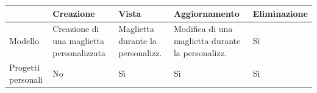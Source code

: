 \documentclass[12pt,italian,]{report}
\begin{document}
\begin{longtable}[]{lllll}
\toprule
\begin{minipage}[b]{0.17\columnwidth}\raggedright
\strut
\end{minipage} & \begin{minipage}[c]{0.17\columnwidth}\raggedright
Creazione\strut
\end{minipage} & \begin{minipage}[c]{0.17\columnwidth}\raggedright
Vista\strut
\end{minipage} & \begin{minipage}[c]{0.27\columnwidth}\raggedright
Aggiornamento\strut
\end{minipage} & \begin{minipage}[c]{0.17\columnwidth}\raggedright
Eliminazione\strut
\end{minipage}\tabularnewline
\midrule
\endhead
\begin{minipage}[t]{0.17\columnwidth}\raggedright
Modello\strut
\end{minipage} & \begin{minipage}[t]{0.17\columnwidth}\raggedright
Creazione di una maglietta personalizzata\strut
\end{minipage} & \begin{minipage}[t]{0.17\columnwidth}\raggedright
Maglietta durante la personalizz.\strut
\end{minipage} & \begin{minipage}[t]{0.17\columnwidth}\raggedright
Modifica di una maglietta durante la personalizz.\strut
\end{minipage} & \begin{minipage}[t]{0.17\columnwidth}\raggedright
Sì\strut
\end{minipage}\tabularnewline
\begin{minipage}[t]{0.17\columnwidth}\raggedright
Progetti personali\strut
\end{minipage} & \begin{minipage}[t]{0.17\columnwidth}\raggedright
No\strut
\end{minipage} & \begin{minipage}[t]{0.17\columnwidth}\raggedright
Sì\strut
\end{minipage} & \begin{minipage}[t]{0.17\columnwidth}\raggedright
Sì\strut
\end{minipage} & \begin{minipage}[t]{0.17\columnwidth}\raggedright
Sì\strut
\end{minipage}\tabularnewline

\end{longtable}
\end{document}
